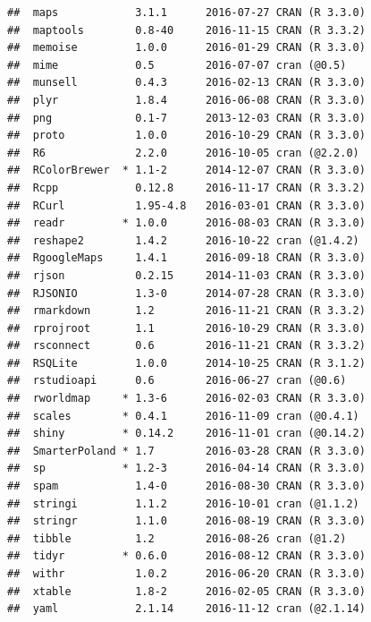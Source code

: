 \documentclass[nojss]{jss}\usepackage[]{graphicx}\usepackage[]{color}
\makeatletter
\newenvironment{kframe}{%
 \def\at@end@of@kframe{}%
 \ifinner\ifhmode%
  \def\at@end@of@kframe{\end{minipage}}%
  \begin{minipage}{\columnwidth}%
 \fi\fi%
 \def\FrameCommand##1{\hskip\@totalleftmargin \hskip-\fboxsep
 \colorbox{shadecolor}{##1}\hskip-\fboxsep
     \hskip-\linewidth \hskip-\@totalleftmargin \hskip\columnwidth}%
 \MakeFramed {\advance\hsize-\width
   \@totalleftmargin\z@ \linewidth\hsize
   \@setminipage}}%
 {\par\unskip\endMakeFramed%
 \at@end@of@kframe}
\newenvironment{knitrout}{}{} %
\makeatother
\begin{document}
\begin{knitrout}
\begin{kframe}
\begin{verbatim}
##  maps            3.1.1      2016-07-27 CRAN (R 3.3.0)                 
##  maptools        0.8-40     2016-11-15 CRAN (R 3.3.2)                 
##  memoise         1.0.0      2016-01-29 CRAN (R 3.3.0)                 
##  mime            0.5        2016-07-07 cran (@0.5)                    
##  munsell         0.4.3      2016-02-13 CRAN (R 3.3.0)                 
##  plyr            1.8.4      2016-06-08 CRAN (R 3.3.0)                 
##  png             0.1-7      2013-12-03 CRAN (R 3.3.0)                 
##  proto           1.0.0      2016-10-29 CRAN (R 3.3.0)                 
##  R6              2.2.0      2016-10-05 cran (@2.2.0)                  
##  RColorBrewer  * 1.1-2      2014-12-07 CRAN (R 3.3.0)                 
##  Rcpp            0.12.8     2016-11-17 CRAN (R 3.3.2)                 
##  RCurl           1.95-4.8   2016-03-01 CRAN (R 3.3.0)                 
##  readr         * 1.0.0      2016-08-03 CRAN (R 3.3.0)                 
##  reshape2        1.4.2      2016-10-22 cran (@1.4.2)                  
##  RgoogleMaps     1.4.1      2016-09-18 CRAN (R 3.3.0)                 
##  rjson           0.2.15     2014-11-03 CRAN (R 3.3.0)                 
##  RJSONIO         1.3-0      2014-07-28 CRAN (R 3.3.0)                 
##  rmarkdown       1.2        2016-11-21 CRAN (R 3.3.2)                 
##  rprojroot       1.1        2016-10-29 CRAN (R 3.3.0)                 
##  rsconnect       0.6        2016-11-21 CRAN (R 3.3.2)                 
##  RSQLite         1.0.0      2014-10-25 CRAN (R 3.1.2)                 
##  rstudioapi      0.6        2016-06-27 cran (@0.6)                    
##  rworldmap     * 1.3-6      2016-02-03 CRAN (R 3.3.0)                 
##  scales        * 0.4.1      2016-11-09 cran (@0.4.1)                  
##  shiny         * 0.14.2     2016-11-01 cran (@0.14.2)                 
##  SmarterPoland * 1.7        2016-03-28 CRAN (R 3.3.0)                 
##  sp            * 1.2-3      2016-04-14 CRAN (R 3.3.0)                 
##  spam            1.4-0      2016-08-30 CRAN (R 3.3.0)                 
##  stringi         1.1.2      2016-10-01 cran (@1.1.2)                  
##  stringr         1.1.0      2016-08-19 CRAN (R 3.3.0)                 
##  tibble          1.2        2016-08-26 cran (@1.2)                    
##  tidyr         * 0.6.0      2016-08-12 CRAN (R 3.3.0)                 
##  withr           1.0.2      2016-06-20 CRAN (R 3.3.0)                 
##  xtable          1.8-2      2016-02-05 CRAN (R 3.3.0)                 
##  yaml            2.1.14     2016-11-12 cran (@2.1.14)
\end{verbatim}
\end{kframe}
\end{knitrout}
\end{document}
